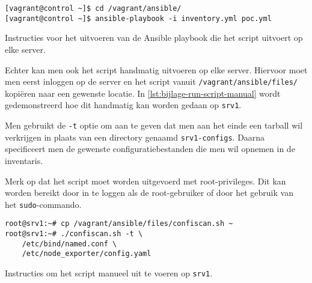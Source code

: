 \begin{listing}
  \begin{verbatim}
[vagrant@control ~]$ cd /vagrant/ansible/
[vagrant@control ~]$ ansible-playbook -i inventory.yml poc.yml
  \end{verbatim}
  \caption[Uitvoeren van Ansible playbook.]{Instructies voor het uitvoeren van de Ansible playbook die het script uitvoert op elke server.}
  \label{lst:bijlage-run-playbook}
\end{listing}

Echter kan men ook het script handmatig uitvoeren op elke server.
Hiervoor moet men eerst inloggen op de server en het script vanuit \texttt{/vagrant/ansible/files/} kopi\"eren naar een gewenste locatie.
In \ref{lst:bijlage-run-script-manual} wordt gedemonstreerd hoe dit handmatig kan worden gedaan op \texttt{srv1}.

Men gebruikt de \texttt{-t} optie om aan te geven dat men aan het einde een tarball wil verkrijgen in plaats van een directory genaamd \texttt{srv1-configs}.
Daarna specificeert men de gewenste configuratiebestanden die men wil opnemen in de inventaris.

Merk op dat het script moet worden uitgevoerd met root-privileges.
Dit kan worden bereikt door in te loggen als de root-gebruiker of door het gebruik van het \texttt{sudo}-commando.

\begin{listing}
  \begin{verbatim}
root@srv1:~# cp /vagrant/ansible/files/confiscan.sh ~
root@srv1:~# ./confiscan.sh -t \
    /etc/bind/named.conf \
    /etc/node_exporter/config.yaml
  \end{verbatim}
  \caption[Manueel uitvoeren van script op \texttt{srv1}.]{Instructies om het script manueel uit te voeren op \texttt{srv1}.}
  \label{lst:bijlage-run-script-manual}
\end{listing}
